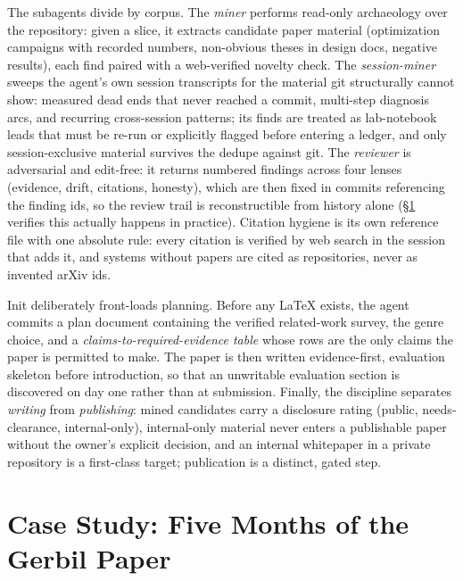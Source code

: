 \documentclass{article}
\begin{document}
The subagents divide by corpus. The \emph{miner} performs read-only archaeology over
the repository: given a slice, it extracts candidate paper material (optimization
campaigns with recorded numbers, non-obvious theses in design docs, negative
results), each find paired with a web-verified novelty check. The
\emph{session-miner} sweeps the agent's own session transcripts for the material git
structurally cannot show: measured dead ends that never reached a commit, multi-step
diagnosis arcs, and recurring cross-session patterns; its finds are treated as
lab-notebook leads that must be re-run or explicitly flagged before entering a
ledger, and only session-exclusive material survives the dedupe against git. The \emph{reviewer} is adversarial
and edit-free: it returns numbered findings across four lenses (evidence, drift,
citations, honesty), which are then fixed in commits referencing the finding ids, so
the review trail is reconstructible from history alone (\S\ref{sec:casestudy}
verifies this actually happens in practice). Citation hygiene is its own reference
file with one absolute rule: every citation is verified by web search in the session
that adds it, and systems without papers are cited as repositories, never as
invented arXiv ids.

Init deliberately front-loads planning. Before any LaTeX exists, the agent commits a
plan document containing the verified related-work survey, the genre choice, and a
\emph{claims-to-required-evidence table} whose rows are the only claims the paper is
permitted to make. The paper is then written evidence-first, evaluation skeleton
before introduction, so that an unwritable evaluation section is discovered on day
one rather than at submission. Finally, the discipline separates \emph{writing} from
\emph{publishing}: mined candidates carry a disclosure rating (public,
needs-clearance, internal-only), internal-only material never enters a publishable
paper without the owner's explicit decision, and an internal whitepaper in a private
repository is a first-class target; publication is a distinct, gated step.

\section{Case Study: Five Months of the Gerbil Paper}
\label{sec:casestudy}
\end{document}
